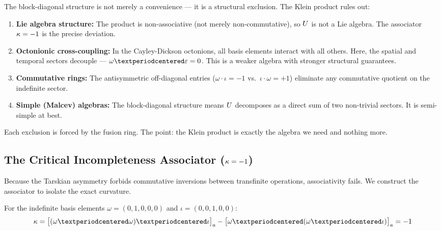\begin{remark}\label{rem:exclusion}
The block-diagonal structure is not merely a convenience --- it is a structural exclusion. The Klein product rules out:
\begin{enumerate}
\item \textbf{Lie algebra structure:} The product is non-associative (not merely non-commutative), so $U$ is not a Lie algebra. The associator $\kappa = -1$ is the precise deviation.
\item \textbf{Octonionic cross-coupling:} In the Cayley-Dickson octonions, all basis elements interact with all others. Here, the spatial and temporal sectors decouple --- $\omega \cdot \eps = \mathbf{0}$. This is a weaker algebra with stronger structural guarantees.
\item \textbf{Commutative rings:} The antisymmetric off-diagonal entries ($\omega \cdot \iota = -1$ vs.\ $\iota \cdot \omega = +1$) eliminate any commutative quotient on the indefinite sector.
\item \textbf{Simple (Malcev) algebras:} The block-diagonal structure means $U$ decomposes as a direct sum of two non-trivial sectors. It is semi-simple at best.
\end{enumerate}
Each exclusion is forced by the fusion ring. The point: the Klein product is exactly the algebra we need and nothing more.
\end{remark}

\subsection{The Critical Incompleteness Associator (\texorpdfstring{$\kappa = -1$}{kappa = -1})}\label{sec:curvature}

Because the Tarskian asymmetry forbids commutative inversions between transfinite operations, associativity fails. We construct the associator to isolate the exact curvature.

\begin{theorem}\label{thm:associator}\label{thm:curvature}
For the indefinite basis elements $\omega = (0,1,0,0,0)$ and $\iota = (0,0,1,0,0)$:
$$\kap = \bigl[(\omega \cdot \omega) \cdot \iota\bigr]_a - \bigl[\omega \cdot (\omega \cdot \iota)\bigr]_a = -1$$
\end{theorem}

